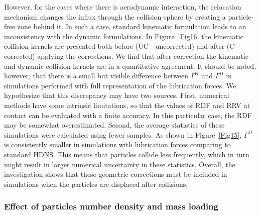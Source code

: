 \documentclass[../thesis.tex]{subfiles}
\begin{document}
However, for the cases where there is aerodynamic interaction, the relocation mechanism changes the influx through the collision sphere by creating a particle-free zone behind it. In such a case, standard kinematic formulation leads to an inconsistency with the dynamic formulations. In Figure~\ref{Fig16} the kinematic collision kernels are presented both before (UC - uncorrected) and after (C - corrected) applying the corrections. We find that after correction the kinematic and dynamic collision kernels are in a quantitative agreement. It should be noted, however, that there is a small but visible difference between $\Gamma^\text{K}$ and $\Gamma^\text{D}$ in simulations performed with full representation of the lubrication forces. We hypothesize that this discrepancy may have two sources. First, numerical methods have some intrinsic limitations, so that the values of RDF and RRV at contact can be evaluated with a finite accuracy. In this particular case, the RDF may be somewhat overestimated. Second, the average statistics of these simulations were calculated using fewer samples. As shown in Figure~\ref{Fig15}, $\Gamma^\text{D}$ is consistently smaller in simulations with lubrication forces comparing to standard HDNS. This means that particles collide less frequently, which in turn might result in larger numerical uncertainty in these statistics. Overall, the investigation shows that these geometric corrections must be included in simulations when the particles are displaced after collisions.



\subsubsection{Effect of particles number density and mass loading}
\end{document}
